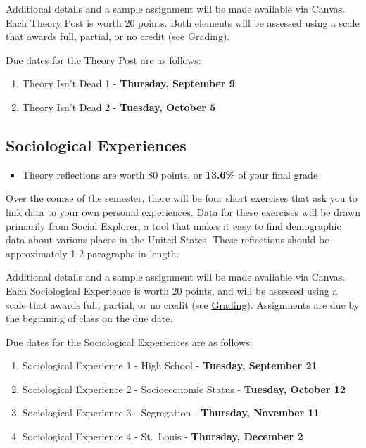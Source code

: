 \documentclass[
]{book}
\providecommand{\tightlist}{%
  \setlength{\itemsep}{0pt}\setlength{\parskip}{0pt}}
\newenvironment{rmdblock}[1]
  {\begin{shaded*}
  \begin{itemize}
  \renewcommand{\labelitemi}{
    \raisebox{-.7\height}[0pt][0pt]{
      {\setkeys{Gin}{width=3em,keepaspectratio}\texttt{[image: images/\#1]}}
    }
  }
  \item
  }
  {
  \end{itemize}
  \end{shaded*}
  }
\newenvironment{rmdtip}
  {\begin{rmdblock}{tip}}
  {\end{rmdblock}}
\begin{document}
Additional details and a sample assignment will be made available via Canvas. Each Theory Post is worth 20 points. Both elements will be assessed using a scale that awards full, partial, or no credit (see \href{grading.html}{Grading}).

Due dates for the Theory Post are as follows:

\begin{enumerate}
\def\labelenumi{\arabic{enumi}.}
\tightlist
\item
  Theory Isn't Dead 1 - \textbf{Thursday, September 9}
\item
  Theory Isn't Dead 2 - \textbf{Tuesday, October 5}
\end{enumerate}

\hypertarget{sociological-experiences}{%
\subsection{Sociological Experiences}\label{sociological-experiences}}

\begin{rmdtip}
Theory reflections are worth 80 points, or \textbf{13.6\%} of your final
grade
\end{rmdtip}

Over the course of the semester, there will be four short exercises that ask you to link data to your own personal experiences. Data for these exercises will be drawn primarily from Social Explorer, a tool that makes it easy to find demographic data about various places in the United States. These reflections should be approximately 1-2 paragraphs in length.

Additional details and a sample assignment will be made available via Canvas. Each Sociological Experience is worth 20 points, and will be assessed using a scale that awards full, partial, or no credit (see \href{grading.html}{Grading}). Assignments are due by the beginning of class on the due date.

Due dates for the Sociological Experiences are as follows:

\begin{enumerate}
\def\labelenumi{\arabic{enumi}.}
\tightlist
\item
  Sociological Experience 1 - High School - \textbf{Tuesday, September 21}
\item
  Sociological Experience 2 - Socioeconomic Status - \textbf{Tuesday, October 12}
\item
  Sociological Experience 3 - Segregation - \textbf{Thursday, November 11}
\item
  Sociological Experience 4 - St.~Louis - \textbf{Thursday, December 2}
\end{enumerate}
\end{document}
